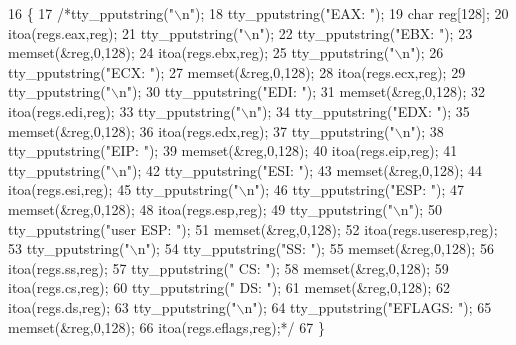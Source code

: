 \begin{DoxyCode}
16                              \{
17     \textcolor{comment}{/*tty\_pputstring("\(\backslash\)n");}
18 \textcolor{comment}{    tty\_pputstring("EAX: ");}
19 \textcolor{comment}{    char reg[128];}
20 \textcolor{comment}{    itoa(regs.eax,reg);}
21 \textcolor{comment}{    tty\_pputstring("\(\backslash\)n");}
22 \textcolor{comment}{    tty\_pputstring("EBX: ");}
23 \textcolor{comment}{    memset(&reg,0,128);}
24 \textcolor{comment}{    itoa(regs.ebx,reg);}
25 \textcolor{comment}{    tty\_pputstring("\(\backslash\)n");}
26 \textcolor{comment}{    tty\_pputstring("ECX: ");}
27 \textcolor{comment}{    memset(&reg,0,128);}
28 \textcolor{comment}{    itoa(regs.ecx,reg);}
29 \textcolor{comment}{    tty\_pputstring("\(\backslash\)n");}
30 \textcolor{comment}{    tty\_pputstring("EDI: ");}
31 \textcolor{comment}{    memset(&reg,0,128);}
32 \textcolor{comment}{    itoa(regs.edi,reg);}
33 \textcolor{comment}{    tty\_pputstring("\(\backslash\)n");}
34 \textcolor{comment}{    tty\_pputstring("EDX: ");}
35 \textcolor{comment}{    memset(&reg,0,128);}
36 \textcolor{comment}{    itoa(regs.edx,reg);}
37 \textcolor{comment}{    tty\_pputstring("\(\backslash\)n");}
38 \textcolor{comment}{    tty\_pputstring("EIP: ");}
39 \textcolor{comment}{    memset(&reg,0,128);}
40 \textcolor{comment}{    itoa(regs.eip,reg);}
41 \textcolor{comment}{    tty\_pputstring("\(\backslash\)n");}
42 \textcolor{comment}{    tty\_pputstring("ESI: ");}
43 \textcolor{comment}{    memset(&reg,0,128);}
44 \textcolor{comment}{    itoa(regs.esi,reg);}
45 \textcolor{comment}{    tty\_pputstring("\(\backslash\)n");}
46 \textcolor{comment}{    tty\_pputstring("ESP: ");}
47 \textcolor{comment}{    memset(&reg,0,128);}
48 \textcolor{comment}{    itoa(regs.esp,reg);}
49 \textcolor{comment}{    tty\_pputstring("\(\backslash\)n");}
50 \textcolor{comment}{    tty\_pputstring("user ESP: ");}
51 \textcolor{comment}{    memset(&reg,0,128);}
52 \textcolor{comment}{    itoa(regs.useresp,reg);}
53 \textcolor{comment}{    tty\_pputstring("\(\backslash\)n");}
54 \textcolor{comment}{    tty\_pputstring("SS: ");}
55 \textcolor{comment}{    memset(&reg,0,128);}
56 \textcolor{comment}{    itoa(regs.ss,reg);}
57 \textcolor{comment}{    tty\_pputstring(" CS: ");}
58 \textcolor{comment}{    memset(&reg,0,128);}
59 \textcolor{comment}{    itoa(regs.cs,reg);}
60 \textcolor{comment}{    tty\_pputstring(" DS: ");}
61 \textcolor{comment}{    memset(&reg,0,128);}
62 \textcolor{comment}{    itoa(regs.ds,reg);}
63 \textcolor{comment}{    tty\_pputstring("\(\backslash\)n");}
64 \textcolor{comment}{    tty\_pputstring("EFLAGS: ");}
65 \textcolor{comment}{    memset(&reg,0,128);}
66 \textcolor{comment}{    itoa(regs.eflags,reg);*/}
67 \}
\end{DoxyCode}
